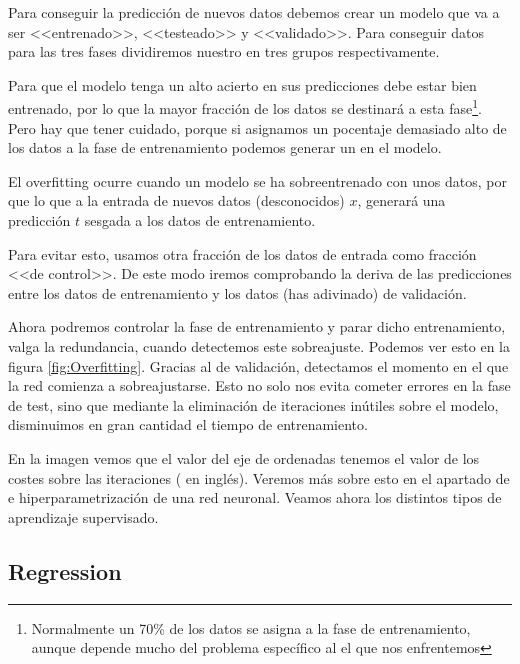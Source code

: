 Para conseguir la predicción de nuevos datos debemos crear un modelo que va a ser <<entrenado>>, <<testeado>> y <<validado>>. Para conseguir datos para las tres fases dividiremos nuestro  en tres grupos respectivamente.

Para que el modelo tenga un alto acierto en sus predicciones debe estar bien entrenado, por lo que la mayor fracción de los datos se destinará a esta fase\footnote{Normalmente un 70\% de los datos se asigna a la fase de entrenamiento, aunque depende mucho del problema específico al el que nos enfrentemos}. Pero hay que tener cuidado, porque si asignamos un pocentaje demasiado alto de los datos a la fase de entrenamiento podemos generar un  en el modelo.

El overfitting ocurre cuando un modelo se ha sobreentrenado con unos datos, por que lo que a la entrada de nuevos datos (desconocidos) $x$, generará una predicción $t$ sesgada a los datos de entrenamiento.

Para evitar esto, usamos otra fracción de los datos de entrada como fracción <<de control>>. De este modo iremos comprobando la deriva de las predicciones entre los datos de entrenamiento y los datos (has adivinado) de validación.

Ahora podremos controlar la fase de entrenamiento y parar dicho entrenamiento, valga la redundancia, cuando detectemos este sobreajuste. Podemos ver esto en la figura \ref{fig:Overfitting}.
Gracias al  de validación, detectamos el momento en el que la red comienza a sobreajustarse. Esto no solo nos evita cometer errores en la fase de test, sino que mediante la eliminación de iteraciones inútiles sobre el modelo, disminuimos en gran cantidad el tiempo de entrenamiento.


En la imagen vemos que el valor del eje de ordenadas tenemos el valor de los costes sobre las iteraciones ( en inglés). Veremos más sobre esto en el apartado de  e hiperparametrización de una red neuronal. Veamos ahora los distintos tipos de aprendizaje supervisado.

\subsection{Regression}

